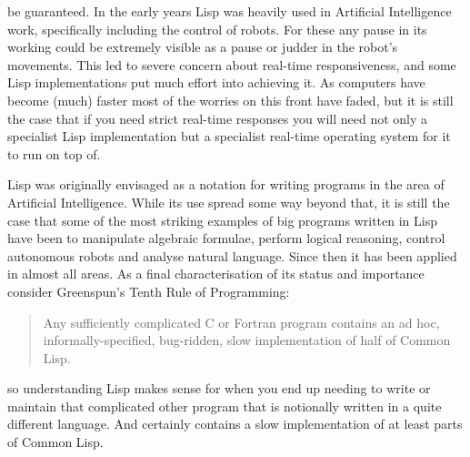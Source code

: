 \begin{description}
be guaranteed. In the early years Lisp was heavily used in Artificial
Intelligence work, specifically including the control of robots. For these
any pause in its working could be extremely visible as a pause or judder
in the robot's movements. This led to severe concern about real-time
responsiveness, and some Lisp implementations put much effort into
achieving it. As computers have become (much) faster most of the worries
on this front have faded, but it is still the case that if you need
strict real-time responses you will need not only a specialist Lisp
implementation but a specialist real-time operating system for it to run
on top of.
\end{description}

Lisp was originally envisaged as a notation for writing programs in the
area of Artificial Intelligence. While its use spread some way
beyond that, it is still the case that some of the most striking
examples of big programs written in Lisp have been to manipulate
algebraic formulae, perform logical reasoning, control autonomous
robots and analyse natural language. Since then it has been applied in
almost all areas. As a final characterisation of its status and importance
consider Greenspun's Tenth Rule of Programming\cite{greenspun}:
{\em \begin{quotation}
Any sufficiently complicated C or Fortran program contains an ad hoc,
informally-specified, bug-ridden, slow implementation of half of Common Lisp. 
\end{quotation}}
so understanding Lisp makes sense for when you end up needing to write
or maintain that complicated other program that is notionally written
in a quite different language. And \vsl certainly contains a slow
implementation of at least parts of Common Lisp.


